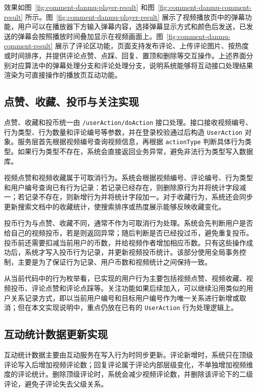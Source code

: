 效果如图~\ref{fig:comment-danmu-player-result} 和图~\ref{fig:comment-danmu-comment-result} 所示。图~\ref{fig:comment-danmu-player-result} 展示了视频播放页中的弹幕功能，用户可以在播放器下方输入弹幕内容，选择弹幕显示方式和颜色后发送，已发送的弹幕会按照播放时间叠加显示在视频画面上。图~\ref{fig:comment-danmu-comment-result} 展示了评论区功能，页面支持发布评论、上传评论图片、按热度或时间排序，并提供评论点赞、点踩、回复、置顶和删除等交互操作。上述界面分别对应算法中的弹幕处理分支和评论处理分支，说明系统能够将互动接口处理结果渲染为可直接操作的播放页互动功能。


\subsection{点赞、收藏、投币与关注实现}

点赞、收藏和投币统一由 \texttt{/userAction/doAction} 接口处理。接口接收视频编号、行为类型、行为数量和评论编号等参数，并在登录校验通过后构造 \texttt{UserAction} 对象。服务层首先根据视频编号查询视频信息，再根据 \texttt{actionType} 判断具体行为类型。如果行为类型不存在，系统会直接返回业务异常，避免非法行为类型写入数据库。

视频点赞和视频收藏属于可取消行为。系统会根据视频编号、评论编号、行为类型和用户编号查询已有行为记录：若记录已经存在，则删除原行为并将统计字段减一；若记录不存在，则新增行为并将统计字段加一。对于收藏行为，系统还会同步更新搜索文档中的收藏统计，使搜索排序或热度展示能够反映收藏变化。

投币行为与点赞、收藏不同，通常不作为可取消行为处理。系统会先判断用户是否给自己的视频投币，若是则返回异常；随后判断是否已经投过币，避免重复投币。投币前还需要扣减当前用户的币数，并给视频作者增加相应币数。只有这些操作成功后，系统才写入投币行为记录，并更新视频投币统计。该部分使用全局事务控制，主要是为了保证行为记录、用户币数和视频统计之间保持一致。

从当前代码中的行为枚举看，已实现的用户行为主要包括视频点赞、视频收藏、视频投币、评论点赞和评论点踩等。关注功能如果后续加入，可以继续沿用类似的用户关系记录方式，即以当前用户编号和目标用户编号作为唯一关系进行新增或取消；但在本文实现说明中，重点仍放在已有的 \texttt{UserAction} 行为处理逻辑上。

\subsection{互动统计数据更新实现}

互动统计数据主要由互动服务在写入行为时同步更新。评论新增时，系统只在顶级评论写入后增加视频评论数；回复评论属于评论内部层级变化，不单独增加视频维度的评论统计。删除顶级评论时，系统会减少视频评论数，并删除该评论下的二级评论，避免子评论失去父级关系。

